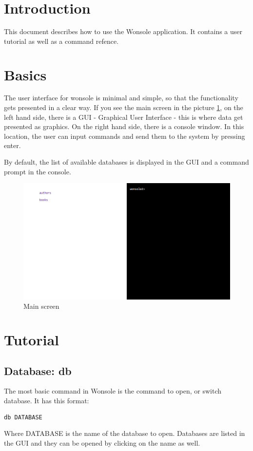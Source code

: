 \section{Introduction}
This document describes how to use the Wonsole application. It contains a user
tutorial as well as a command refence.

\section{Basics}
The user interface for wonsole is minimal and simple, so that the functionality gets
presented in a clear way. If you see the main screen in the
picture \ref{wonsole2-00}, on the left hand side, there is a GUI - Graphical
User Interface - this is where data get presented as graphics. On the right hand side, there is a console window. In this location,
the user can input commands and send them to the system by
pressing enter.

By default, the list of available databases is displayed in the GUI and
a command prompt in the console.


\begin{figure}
\centering
\includegraphics[width=\textwidth]{../../manual/screenshot/wonsole2/wonsole2-00.png}
\caption{Main screen}
\label{wonsole2-00}
\end{figure}

\section{Tutorial}

\subsection{Database: db}
The most basic command in Wonsole is the command to open, or switch database. It
has this format:
\begin{verbatim}
db DATABASE
\end{verbatim}
Where DATABASE is the name of the database to open. Databases are listed in the GUI
and they can be opened by clicking on the name as well.

